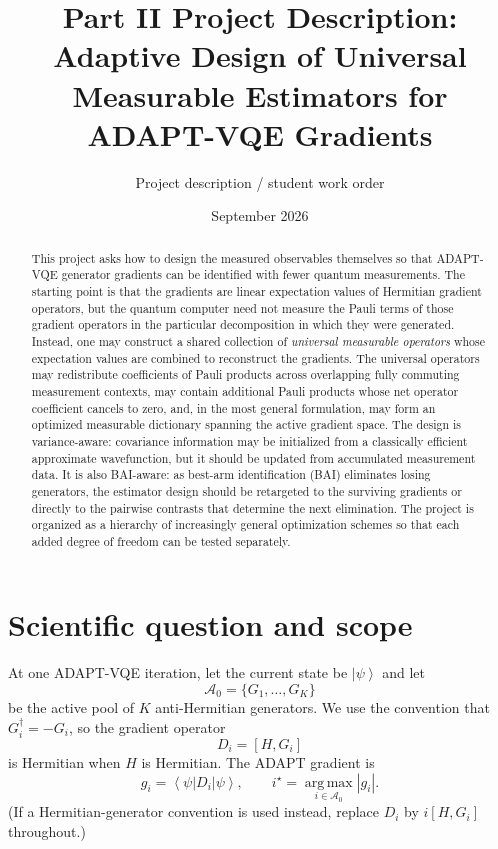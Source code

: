 \documentclass[11pt]{article}
\title{Part II Project Description:\\Adaptive Design of Universal Measurable Estimators for ADAPT-VQE Gradients}
\author{Project description / student work order}
\date{September 2026}
\newcommand{\ket}[1]{\left|#1\right\rangle}
\newcommand{\bra}[1]{\left\langle#1\right|}
\newcommand{\argmax}{\operatorname*{arg\,max}}
\newcommand{\Aset}{\mathcal A}
\begin{document}
\maketitle

\begin{abstract}
This project asks how to design the measured observables themselves so that ADAPT-VQE generator gradients can be identified with fewer quantum measurements.  The starting point is that the gradients are linear expectation values of Hermitian gradient operators, but the quantum computer need not measure the Pauli terms of those gradient operators in the particular decomposition in which they were generated.  Instead, one may construct a shared collection of \emph{universal measurable operators} whose expectation values are combined to reconstruct the gradients.  The universal operators may redistribute coefficients of Pauli products across overlapping fully commuting measurement contexts, may contain additional Pauli products whose net operator coefficient cancels to zero, and, in the most general formulation, may form an optimized measurable dictionary spanning the active gradient space.  The design is variance-aware: covariance information may be initialized from a classically efficient approximate wavefunction, but it should be updated from accumulated measurement data.  It is also BAI-aware: as best-arm identification (BAI) eliminates losing generators, the estimator design should be retargeted to the surviving gradients or directly to the pairwise contrasts that determine the next elimination.  The project is organized as a hierarchy of increasingly general optimization schemes so that each added degree of freedom can be tested separately.
\end{abstract}

\section{Scientific question and scope}

At one ADAPT-VQE iteration, let the current state be $\ket{\psi}$ and let
\begin{equation}
  \Aset_0=\{G_1,\ldots,G_K\}
\end{equation}
be the active pool of $K$ anti-Hermitian generators.  We use the convention that $G_i^\dagger=-G_i$, so the gradient operator
\begin{equation}
  D_i=[H,G_i]
  \label{eq:Di}
\end{equation}
is Hermitian when $H$ is Hermitian.  The ADAPT gradient is
\begin{equation}
  g_i=\bra{\psi}D_i\ket{\psi},
  \qquad
  i^\star=\argmax_{i\in\Aset_0}|g_i|.
  \label{eq:target}
\end{equation}
(If a Hermitian-generator convention is used instead, replace $D_i$ by $i[H,G_i]$ throughout.)
\end{document}
